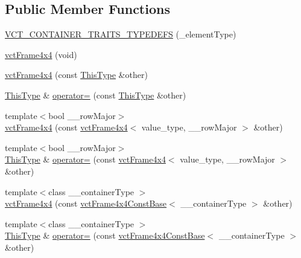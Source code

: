 \subsection*{Public Member Functions}
\begin{DoxyCompactItemize}
\item 
\hyperlink{classvct_frame4x4_a9c3c04d1e23fe869357b974b12f01f65}{V\+C\+T\+\_\+\+C\+O\+N\+T\+A\+I\+N\+E\+R\+\_\+\+T\+R\+A\+I\+T\+S\+\_\+\+T\+Y\+P\+E\+D\+E\+F\+S} (\+\_\+element\+Type)
\item 
\hyperlink{classvct_frame4x4_a8943d78926fcff0830ee33970941fa85}{vct\+Frame4x4} (void)
\item 
\hyperlink{classvct_frame4x4_ab4e2300781ad111c686aee75f167afcc}{vct\+Frame4x4} (const \hyperlink{classvct_fixed_size_const_matrix_base_a7ec66a96ed7e08ce9ff54093133c9d8d}{This\+Type} \&other)
\item 
\hyperlink{classvct_fixed_size_const_matrix_base_a7ec66a96ed7e08ce9ff54093133c9d8d}{This\+Type} \& \hyperlink{classvct_frame4x4_a9fa62beabd6999e4acacb5cc5e492032}{operator=} (const \hyperlink{classvct_fixed_size_const_matrix_base_a7ec66a96ed7e08ce9ff54093133c9d8d}{This\+Type} \&other)
\item 
{\footnotesize template$<$bool \+\_\+\+\_\+row\+Major$>$ }\\\hyperlink{classvct_frame4x4_ad505c1c509931304b74caf2208375b8b}{vct\+Frame4x4} (const \hyperlink{classvct_frame4x4}{vct\+Frame4x4}$<$ value\+\_\+type, \+\_\+\+\_\+row\+Major $>$ \&other)
\item 
{\footnotesize template$<$bool \+\_\+\+\_\+row\+Major$>$ }\\\hyperlink{classvct_fixed_size_const_matrix_base_a7ec66a96ed7e08ce9ff54093133c9d8d}{This\+Type} \& \hyperlink{classvct_frame4x4_aaca53a8203ae39d6cad2dd649737cd21}{operator=} (const \hyperlink{classvct_frame4x4}{vct\+Frame4x4}$<$ value\+\_\+type, \+\_\+\+\_\+row\+Major $>$ \&other)
\item 
{\footnotesize template$<$class \+\_\+\+\_\+container\+Type $>$ }\\\hyperlink{classvct_frame4x4_a87c08f13809f15c709d5c0bcb604b746}{vct\+Frame4x4} (const \hyperlink{classvct_frame4x4_const_base}{vct\+Frame4x4\+Const\+Base}$<$ \+\_\+\+\_\+container\+Type $>$ \&other)
\item 
{\footnotesize template$<$class \+\_\+\+\_\+container\+Type $>$ }\\\hyperlink{classvct_fixed_size_const_matrix_base_a7ec66a96ed7e08ce9ff54093133c9d8d}{This\+Type} \& \hyperlink{classvct_frame4x4_a01ab8db70f4dc199ff0c8fbf75b49d06}{operator=} (const \hyperlink{classvct_frame4x4_const_base}{vct\+Frame4x4\+Const\+Base}$<$ \+\_\+\+\_\+container\+Type $>$ \&other)

\end{DoxyCompactItemize}
